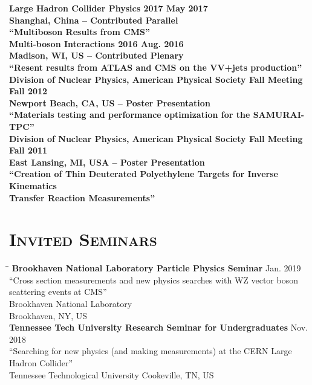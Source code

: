 \documentclass[10pt]{res} %
\begin{document}
\begin{resume}
\begin{tabbing}
\bf{Large Hadron Collider Physics 2017} 		 \> \>	    May 2017 \\
Shanghai, China -- Contributed Parallel \\
``Multiboson Results from CMS'' \\
\bf{Multi-boson Interactions 2016} 		 \> \>	    Aug. 2016 \\
Madison, WI, US -- Contributed Plenary \\
``Resent results from ATLAS and CMS on the VV+jets production'' \\
\bf{Division of Nuclear Physics, American Physical Society Fall Meeting} 		 \> \>	    Fall 2012 \\
Newport Beach, CA, US -- Poster Presentation\\
``Materials testing and performance optimization for the SAMURAI-TPC'' \\
\bf{Division of Nuclear Physics, American Physical Society Fall Meeting} 		 \> \>	    Fall 2011 \\
East Lansing, MI, USA -- Poster Presentation\\ 
``Creation of Thin Deuterated Polyethylene Targets for Inverse Kinematics \\Transfer Reaction Measurements'' \\
\end{tabbing}\vspace{-20pt}      %

\section{\textsc{Invited Seminars}}
\vspace{-0.1in}
\begin{tabbing}
\hspace{2.3in}\= \hspace{2.6in}\= \kill %
\textbf{Brookhaven National Laboratory Particle Physics Seminar} \>\> Jan. 2019\\ 
``Cross section measurements and new physics searches with WZ vector boson scattering events at CMS'' \\
Brookhaven National Laboratory \\
Brookhaven, NY, US \\
\textbf{Tennessee Tech University Research Seminar for Undergraduates} \>\> Nov. 2018\\ 
``Searching for new physics (and making measurements) at the CERN Large Hadron Collider'' \\
Tennessee Technological University
Cookeville, TN, US \\
\end{tabbing}\vspace{-20pt}      %


\end{resume}
\end{document}

